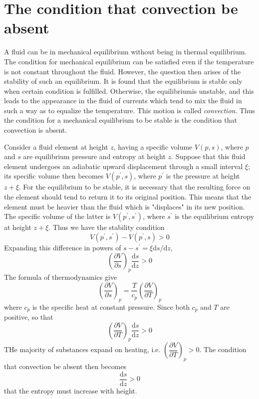 \documentclass[conference]{IEEEtran}
\theoremstyle{definition}
\theoremstyle{remark}
\begin{document}
    \section{The condition that convection be absent}
    A fluid can be in mechanical equilibrium without being in thermal equilibrium. The condition for mechanical equilibrium can be satisfied even if the temperature is not constant throughout the fluid. However, the question then arises of the stability of such an equilibrium. It is found that the equilibrium is stable only when certain condition is fulfilled. Otherwise, the equilibriumis unstable, and this leads to the appearance in the fluid of currents which tend to mix the fluid in such a way as to equalize the temperature. This motion is called \emph{convection}. Thus the condition for a mechanical equilibrium to be stable is the condition that convection is absent.

    Consider a fluid element at height $z$, having a specific volume $V(p, s)$, where $p$ and $s$ are equilibrium pressure and entropy at height $z$. Suppose that this fluid element undergoes an adiabatic upward displacement through a small interval $\xi$; its specific volume then becomes $V(p^\prime, s)$, where $p^\prime$ is the pressure at height $z + \xi$. For the equilibrium to be stable, it is necessary that the resulting force on the element should tend to return it to its original position. This means that the element must be heavier than the fluid which is "displaces" in its new position. The specific volume of the latter is $V(p^\prime, s^\prime)$, where $s^\prime$ is the equilibrium entropy at height $z + \xi$. Thus we have the stability condition
    \[
        V(p^\prime, s^\prime) - V(p^\prime, s) > 0
    \]
    Expanding this difference in powers of $s - s^\prime = \xi \mathrm{d} s / \mathrm{d} z$,
    \begin{equation}
        \left( \dfrac{\partial V}{\partial s}\right)_p \dfrac{\mathrm{d} s}{\mathrm{d} z} > 0
    \end{equation}
    The formula of thermodynamics give
    \[
        \left( \dfrac{\partial  V}{\partial s} \right)_p = \dfrac{T}{c_p} \left( \dfrac{\partial V}{\partial T} \right)_p
    \]
    where $c_p$ is the specific heat at constant pressure. Since both $c_p$ and $T$ are positive, so that
    \begin{equation}
        \left( \dfrac{\partial V}{\partial T} \right)_p \dfrac{\mathrm{d} s}{\mathrm{d} z} > 0
    \end{equation}
    THe majority of substances expand on heating, i.e. $\left( \dfrac{\partial V}{\partial T} \right)_p > 0$. The condition that convection be absent then becomes
    \begin{equation}
        \dfrac{\mathrm{d} s}{\mathrm{d} z} > 0
    \end{equation}
    that the entropy must increase with height.
\end{document}

